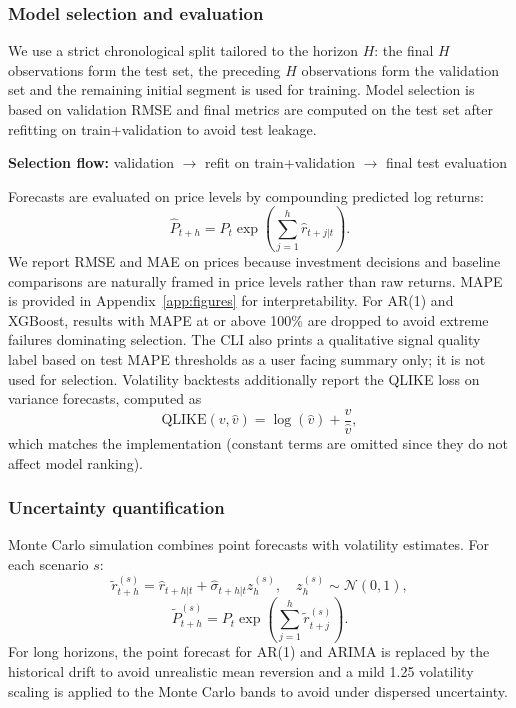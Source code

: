 \documentclass[11pt,a4paper]{article}
\begin{document}
\subsubsection{Model selection and evaluation}
We use a strict chronological split tailored to the horizon $H$: the final $H$ observations form the test set, the preceding $H$ observations form the validation set and the remaining initial segment is used for training. Model selection is based on validation RMSE and final metrics are computed on the test set after refitting on train+validation to avoid test leakage.
\begin{center}
\small\textbf{Selection flow:} validation $\rightarrow$ refit on train+validation $\rightarrow$ final test evaluation
\end{center}
Forecasts are evaluated on price levels by compounding predicted log returns:
\begin{equation}
\hat P_{t+h} = P_t \exp\left(\sum_{j=1}^{h}\hat r_{t+j|t}\right).
\end{equation}
We report RMSE and MAE on prices because investment decisions and baseline comparisons are naturally framed in price levels rather than raw returns. MAPE is provided in Appendix~\ref{app:figures} for interpretability. For AR(1) and XGBoost, results with MAPE at or above 100\% are dropped to avoid extreme failures dominating selection. The CLI also prints a qualitative signal quality label based on test MAPE thresholds as a user facing summary only; it is not used for selection. Volatility backtests additionally report the QLIKE loss on variance forecasts, computed as
\begin{equation}
\mathrm{QLIKE}(v,\hat v) = \log(\hat v) + \frac{v}{\hat v},
\end{equation}
which matches the implementation (constant terms are omitted since they do not affect model ranking).

\subsubsection{Uncertainty quantification}
Monte Carlo simulation combines point forecasts with volatility estimates. For each scenario $s$:
\begin{equation}
\tilde r^{(s)}_{t+h} = \hat r_{t+h|t} + \hat\sigma_{t+h|t} z_h^{(s)}, \quad z_h^{(s)} \sim \mathcal{N}(0,1),
\end{equation}
\begin{equation}
\tilde P^{(s)}_{t+h} = P_t \exp\left(\sum_{j=1}^{h} \tilde r^{(s)}_{t+j}\right).
\end{equation}
For long horizons, the point forecast for AR(1) and ARIMA is replaced by the historical drift to avoid unrealistic mean reversion and a mild 1.25 volatility scaling is applied to the Monte Carlo bands to avoid under dispersed uncertainty.
\end{document}
